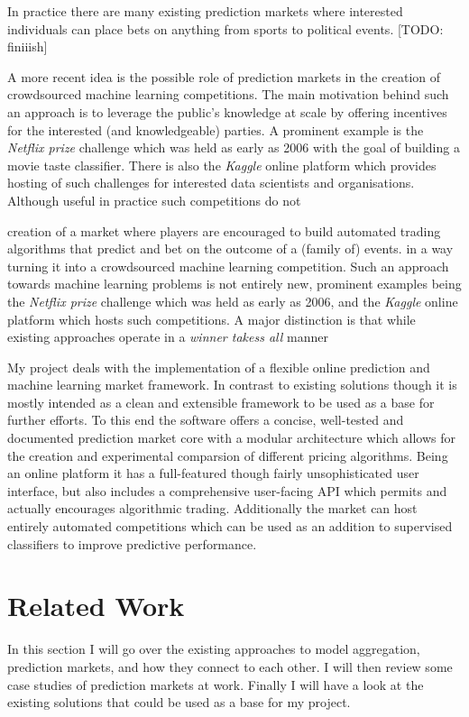 \documentclass[bsc,frontabs,twoside,singlespacing,parskip,deptreport]{infthesis}     %
\begin{document}
	In practice there are many existing prediction markets where interested individuals can place bets on anything from sports to political events. [TODO: finiiish]

	A more recent idea is the possible role of prediction markets in the creation of crowdsourced machine learning competitions. The main motivation behind such an approach is to leverage the public's knowledge at scale by offering incentives for the interested (and knowledgeable) parties. A prominent example is the {\em Netflix prize} challenge which was held as early as 2006 with the goal of building a movie taste classifier. There is also the {\em Kaggle} online platform which provides hosting of such challenges for interested data scientists and organisations. Although useful in practice such competitions do not 
	
	creation of a market where players are encouraged to build automated trading algorithms that predict and bet on the outcome of a (family of) events.  in a way turning it into a crowdsourced machine learning competition. Such an approach towards machine learning problems is not entirely new, prominent examples being the {\em Netflix prize} challenge which was held as early as 2006, and the {\em Kaggle} online platform which hosts such competitions. A major distinction is that while existing approaches operate in a {\em winner takess all} manner

	My project deals with the implementation of a flexible online prediction and machine learning market framework. In contrast to existing solutions  though it is mostly intended as a clean and extensible framework to be used as a base for further efforts. To this end the software offers a concise, well-tested and documented prediction market core with a modular architecture which allows for the creation and experimental comparsion of different pricing algorithms. Being an online platform it has a full-featured though fairly unsophisticated user interface, but also includes a comprehensive user-facing API which permits and actually encourages algorithmic trading. Additionally the market can host entirely automated competitions which can be used as an addition to supervised classifiers to improve predictive performance. 

\chapter{Related Work}

	In this section I will go over the existing approaches to model aggregation, prediction markets, and how they connect to each other. I will then review some case studies of prediction markets at work. Finally I will have a look at the existing solutions that could be used as a base for my project. 
\end{document}
